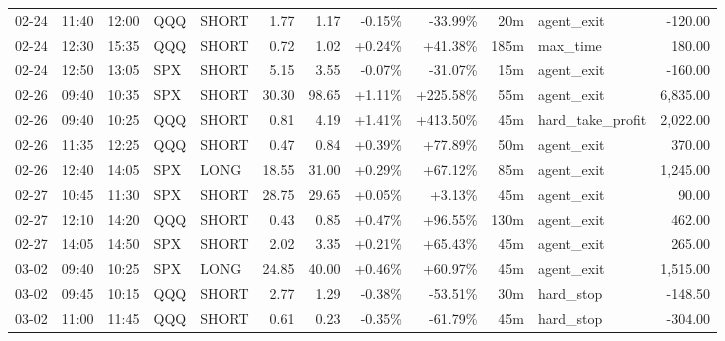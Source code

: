 \documentclass[11pt,a4paper,twoside]{article}
\begin{document}
\begin{center}
\begin{longtable}{>{\color{txtmain}}l l l l l r r r r r >{\color{txtmain}}l r}
02-24 & 11:40 & 12:00 & QQQ & SHORT & 1.77 & 1.17 & \textcolor{lossred}{-0.15\%} & \textcolor{lossred}{-33.99\%} & 20m & agent\_exit & \textcolor{lossred}{-120.00} \\
02-24 & 12:30 & 15:35 & QQQ & SHORT & 0.72 & 1.02 & \textcolor{wingreen}{+0.24\%} & \textcolor{wingreen}{+41.38\%} & 185m & max\_time & \textcolor{wingreen}{180.00} \\
02-24 & 12:50 & 13:05 & SPX & SHORT & 5.15 & 3.55 & \textcolor{lossred}{-0.07\%} & \textcolor{lossred}{-31.07\%} & 15m & agent\_exit & \textcolor{lossred}{-160.00} \\
02-26 & 09:40 & 10:35 & SPX & SHORT & 30.30 & 98.65 & \textcolor{wingreen}{+1.11\%} & \textcolor{wingreen}{+225.58\%} & 55m & agent\_exit & \textcolor{wingreen}{6,835.00} \\
02-26 & 09:40 & 10:25 & QQQ & SHORT & 0.81 & 4.19 & \textcolor{wingreen}{+1.41\%} & \textcolor{wingreen}{+413.50\%} & 45m & hard\_take\_profit & \textcolor{wingreen}{2,022.00} \\
02-26 & 11:35 & 12:25 & QQQ & SHORT & 0.47 & 0.84 & \textcolor{wingreen}{+0.39\%} & \textcolor{wingreen}{+77.89\%} & 50m & agent\_exit & \textcolor{wingreen}{370.00} \\
02-26 & 12:40 & 14:05 & SPX & LONG & 18.55 & 31.00 & \textcolor{wingreen}{+0.29\%} & \textcolor{wingreen}{+67.12\%} & 85m & agent\_exit & \textcolor{wingreen}{1,245.00} \\
02-27 & 10:45 & 11:30 & SPX & SHORT & 28.75 & 29.65 & \textcolor{wingreen}{+0.05\%} & \textcolor{wingreen}{+3.13\%} & 45m & agent\_exit & \textcolor{wingreen}{90.00} \\
02-27 & 12:10 & 14:20 & QQQ & SHORT & 0.43 & 0.85 & \textcolor{wingreen}{+0.47\%} & \textcolor{wingreen}{+96.55\%} & 130m & agent\_exit & \textcolor{wingreen}{462.00} \\
02-27 & 14:05 & 14:50 & SPX & SHORT & 2.02 & 3.35 & \textcolor{wingreen}{+0.21\%} & \textcolor{wingreen}{+65.43\%} & 45m & agent\_exit & \textcolor{wingreen}{265.00} \\
03-02 & 09:40 & 10:25 & SPX & LONG & 24.85 & 40.00 & \textcolor{wingreen}{+0.46\%} & \textcolor{wingreen}{+60.97\%} & 45m & agent\_exit & \textcolor{wingreen}{1,515.00} \\
03-02 & 09:45 & 10:15 & QQQ & SHORT & 2.77 & 1.29 & \textcolor{lossred}{-0.38\%} & \textcolor{lossred}{-53.51\%} & 30m & hard\_stop & \textcolor{lossred}{-148.50} \\
03-02 & 11:00 & 11:45 & QQQ & SHORT & 0.61 & 0.23 & \textcolor{lossred}{-0.35\%} & \textcolor{lossred}{-61.79\%} & 45m & hard\_stop & \textcolor{lossred}{-304.00} \\

\end{longtable}
\end{center}
\end{document}
